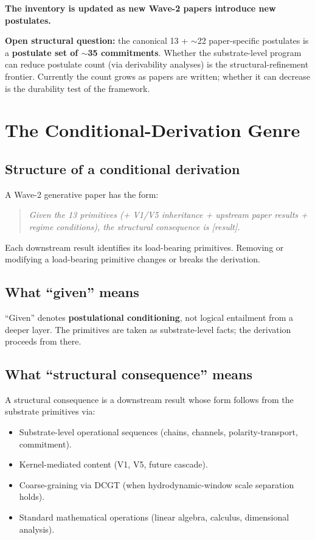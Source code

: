 \documentclass[11pt,a4paper]{article}
\begin{document}
\textbf{The inventory is updated as new Wave-2 papers introduce new postulates.}

\textbf{Open structural question:} the canonical 13 + $\sim$22 paper-specific postulates is a \textbf{postulate set of $\sim$35 commitments}. Whether the substrate-level program can reduce postulate count (via derivability analyses) is the structural-refinement frontier. Currently the count grows as papers are written; whether it can decrease is the durability test of the framework.

\section{The Conditional-Derivation Genre}

\subsection{Structure of a conditional derivation}

A Wave-2 generative paper has the form:

\begin{quote}
\emph{Given the 13 primitives (+ V1/V5 inheritance + upstream paper results + regime conditions), the structural consequence is [result].}
\end{quote}

Each downstream result identifies its load-bearing primitives. Removing or modifying a load-bearing primitive changes or breaks the derivation.

\subsection{What ``given'' means}

``Given'' denotes \textbf{postulational conditioning}, not logical entailment from a deeper layer. The primitives are taken as substrate-level facts; the derivation proceeds from there.

\subsection{What ``structural consequence'' means}

A structural consequence is a downstream result whose form follows from the substrate primitives via:

\begin{itemize}[noitemsep]
\item Substrate-level operational sequences (chains, channels, polarity-transport, commitment).
\item Kernel-mediated content (V1, V5, future cascade).
\item Coarse-graining via DCGT (when hydrodynamic-window scale separation holds).
\item Standard mathematical operations (linear algebra, calculus, dimensional analysis).
\end{itemize}
\end{document}

